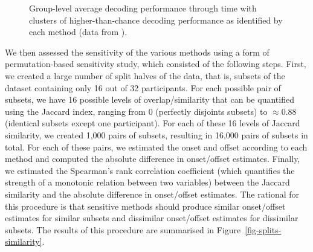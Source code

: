 \documentclass[
  doc,
  floatsintext,
  longtable,
  a4paper,
  nolmodern,
  notxfonts,
  notimes,
  colorlinks=true,linkcolor=blue,citecolor=blue,urlcolor=blue]{apa7}
\begin{document}
\begin{figure}[!htb]

\caption{\label{fig-onset-offset}Group-level average decoding
performance through time with clusters of higher-than-chance decoding
performance as identified by each method (data from
).}


\end{figure}%

We then assessed the sensitivity of the various methods using a form of
permutation-based sensitivity study, which consisted of the following
steps. First, we created a large number of split halves of the data,
that is, subsets of the dataset containing only 16 out of 32
participants. For each possible pair of subsets, we have 16 possible
levels of overlap/similarity that can be quantified using the Jaccard
index, ranging from 0 (perfectly disjoints subsets) to \(\approx0.88\)
(identical subsets except one participant). For each of these 16 levels
of Jaccard similarity, we created 1,000 pairs of subsets, resulting in
16,000 pairs of subsets in total. For each of these pairs, we estimated
the onset and offset according to each method and computed the absolute
difference in onset/offset estimates. Finally, we estimated the
Spearman's rank correlation coefficient (which quantifies the strength
of a monotonic relation between two variables) between the Jaccard
similarity and the absolute difference in onset/offset estimates. The
rational for this procedure is that sensitive methods should produce
similar onset/offset estimates for similar subsets and dissimilar
onset/offset estimates for dissimilar subsets. The results of this
procedure are summarised in Figure~\ref{fig-splits-similarity}.
\end{document}
